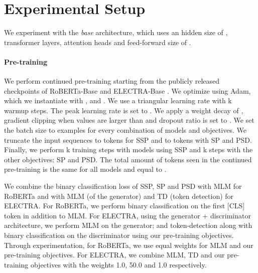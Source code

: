\section{Experimental Setup}
\label{app:experiments}

We experiment with the \textit{base} architecture, which uses an hidden size of ,  transformer layers,  attention heads and feed-forward size of .

\paragraph{Pre-training} We perform continued pre-training starting from the publicly released checkpoints of RoBERTa-Base \cite{liu2019roberta} and ELECTRA-Base \cite{clark2020electra}. We optimize using Adam, which we instantiate with ,  and . We use a triangular learning rate with k warmup steps. The peak learning rate is set to . We apply a weight decay of , gradient clipping when values are larger than  and dropout ratio is set to . We set the batch size to  examples for every combination of models and objectives. We truncate the input sequences to  tokens for SSP and to  tokens with SP and PSD. Finally, we perform k training steps with models using SSP and k steps with the other objectives: SP and PSD. The total amount of tokens seen in the continued pre-training is the same for all models and equal to . 

We combine the binary classification loss of SSP, SP and PSD with MLM for RoBERTa and with MLM (of the generator) and TD (token detection) for ELECTRA. For RoBERTa, we perform binary classification on the first {\small [CLS]} token in addition to MLM. For ELECTRA, using the generator + discriminator architecture, we perform MLM on the generator; and token-detection along with binary classification on the discriminator using our pre-training objectives. Through experimentation, for RoBERTa, we use equal weights for MLM and our pre-training objectives. For ELECTRA, we combine MLM, TD and our pre-training objectives with the weights 1.0, 50.0 and 1.0 respectively.

